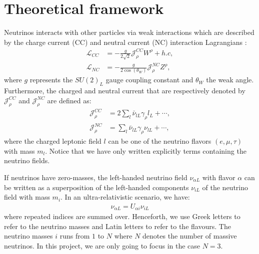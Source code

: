\documentclass[twocolumn,secnumarabic,amssymb, nobibnotes, aps, prd,10pt]{revtex4-1}
\begin{document}
\section{Theoretical framework}
\label{sec:theory}

Neutrinos interacts with other particles via weak interactions which are described
by the charge current (CC) and neutral current (NC) interaction Lagrangians 
\cite{Bilenky:1998dt}:
\begin{align}
\mathcal{L}_{CC} &= - \frac{g}{2 \sqrt{2}} \mathcal{J}^{CC}_\rho W^\rho + h.c, \\
\mathcal{L}_{NC} &= - \frac{g}{2 \cos(\theta_W)} \mathcal{J}^{NC}_\rho Z^\rho,
\end{align}
where $g$ represents the $SU(2)_L$ gauge coupling constant and $\theta_W$ the weak
angle. Furthermore, the charged and neutral current that are respectively denoted
by $\mathcal{J}^{CC}_\rho$ and $\mathcal{J}^{NC}_\rho$ are defined as:
\begin{align}
\mathcal{J}^{CC}_\rho &= 2 \sum_{l} \bar{\nu}_{lL} \gamma_\rho l_L + \cdots, \\
\mathcal{J}^{NC}_\rho &= \sum_{l} \bar{\nu}_{lL} \gamma_\rho \nu_{lL} + \cdots,
\end{align}
where the charged leptonic field $l$ can be one of the neutrino flavors $(e, \mu, \tau)$
with mass $m_l$. Notice that we have only written explicitly terms containing the neutrino
fields.

If neutrinos have zero-masses, the left-handed neutrino field $\nu_{\alpha L}$
with flavor $\alpha$ can be written as a superposition of the left-handed components
$\nu_{iL}$ of the neutrino field with mass $m_i$. In an ultra-relativistic scenario, we
have:
\begin{align}
\nu_{\alpha L} = U_{\alpha i} \nu_{i L}
\label{eq:superposition}
\end{align} 
where repeated indices are summed over. Henceforth, we use Greek letters to refer to
the neutrino masses and Latin letters to refer to the flavours. The neutrino masses
$i$ runs from $1$ to $N$ where $N$ denotes the number of massive neutrinos. In this
project, we are only going to focus in the case $N=3$.
\end{document}
